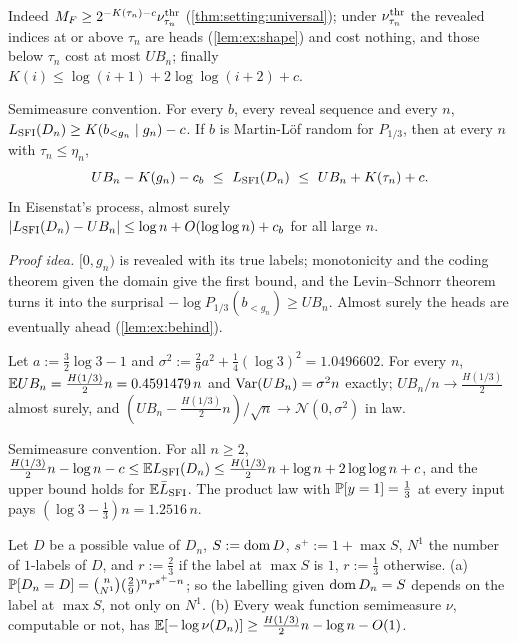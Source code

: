 Indeed $M_{F}\ge2^{-K(\tau_n)-c}\nu^{\rm thr}_{\tau_n}$ (\cref{thm:setting:universal}); under $\nu^{\rm thr}_{\tau_n}$ the revealed indices at or above $\tau_n$ are heads (\cref{lem:ex:shape}) and cost nothing, and those below $\tau_n$ cost at most $UB_n$; finally $K(i)\le\log(i+1)+2\log\log(i+2)+c$.

\begin{theorem}\label{thm:ex:sandwich}
Semimeasure convention. For every $b$, every reveal sequence and every $n$, $L_{\mathrm{SFI}}(D_n)\ge K(b_{<g_n}\mid g_n)-c$. If $b$ is Martin-L\"of random for $P_{1/3}$, then at every $n$ with $\tau_n\le\eta_n$,
\[UB_n-K(g_n)-c_b\ \le\ \LSFI(D_n)\ \le\ UB_n+K(\tau_n)+c.\]
In Eisenstat's process, almost surely $|L_{\mathrm{SFI}}(D_n)-UB_n|\le\log n+O(\log\log n)+c_b$ for all large $n$.
\end{theorem}

\emph{Proof idea.} $[0,g_n)$ is revealed with its true labels; monotonicity and the coding theorem given the domain give the first bound, and the Levin--Schnorr theorem turns it into the surprisal $-\log P_{1/3}(b_{<g_n})\ge UB_n$. Almost surely the heads are eventually ahead (\cref{lem:ex:behind}).

\begin{proposition}\label{prop:ex:asymp}
Let $a:=\frac32\log3-1$ and $\sigma^2:=\frac29a^2+\frac14(\log3)^2=1.0496602$. For every $n$, $\mathbb{E} UB_n=\frac{H(1/3)}2n=0.4591479\,n$ and $\operatorname{Var}(UB_n)=\sigma^2n$ exactly; $UB_n/n\to\frac{H(1/3)}2$ almost surely, and $(UB_n-\frac{H(1/3)}2n)/\sqrt n\to\mathcal N(0,\sigma^2)$ in law.
\end{proposition}

\begin{theorem}\label{thm:ex:expected}
Semimeasure convention. For all $n\ge2$,
$\frac{H(1/3)}2n-\log n-c\le\mathbb{E}L_{\mathrm{SFI}}(D_n)\le\frac{H(1/3)}2n+\log n+2\log\log n+c$, and the upper bound holds for $\mathbb{E}\bar{L}_{\mathrm{SFI}}$. The product law with $\mathbb{P}[y=1]=\frac13$ at every input pays $(\log3-\frac13)n=1.2516\,n$.
\end{theorem}

\begin{proposition}\label{prop:ex:law}
Let $D$ be a possible value of $D_n$, $S:=\operatorname{dom} D$, $s^+:=1+\max S$, $N^1$ the number of $1$-labels of $D$, and $r:=\frac23$ if the label at $\max S$ is $1$, $r:=\frac13$ otherwise.
(a) $\mathbb{P}[D_n=D]=\binom n{N^1}(\frac29)^nr^{s^+-n}$; so the labelling given $\operatorname{dom} D_n=S$ depends on the label at $\max S$, not only on $N^1$.
(b) Every weak function semimeasure $\nu$, computable or not, has $\mathbb{E}[-\log\nu(D_n)]\ge\frac{H(1/3)}2n-\log n-O(1)$.
\end{proposition}

